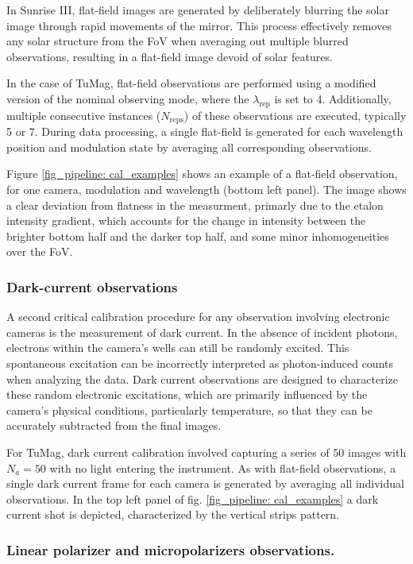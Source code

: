 In Sunrise III, flat-field images are generated by deliberately blurring the solar image through rapid movements of the mirror. This process effectively removes any solar structure from the FoV when averaging out multiple blurred observations, resulting in a flat-field image devoid of solar features.

In the case of TuMag, flat-field observations are performed using a modified version of the nominal observing mode, where the $\lambda_{\text{rep}}$ is set to 4. Additionally, multiple consecutive instances ($N_{\text{reps}}$) of these observations are executed, typically 5 or 7. During data processing, a single flat-field is generated for each wavelength position and modulation state by averaging all corresponding observations.

Figure \ref{fig_pipeline: cal_examples} shows an example of a flat-field observation, for one camera, modulation and wavelength (bottom left panel). The image shows a clear deviation from flatness in the measurment, primarly due to the etalon intensity gradient, which accounts for the change in intensity between the brighter bottom half and the darker top half, and some minor inhomogeneities over the FoV. 

\subsubsection{Dark-current observations}

A second critical calibration procedure for any observation involving electronic cameras is the measurement of dark current. In the absence of incident photons, electrons within the camera's wells can still be randomly excited. This spontaneous excitation can be incorrectly interpreted as photon-induced counts when analyzing the data. Dark current observations are designed to characterize these random electronic excitations, which are primarily influenced by the camera's physical conditions, particularly temperature, so that they can be accurately subtracted from the final images.

For TuMag, dark current calibration involved capturing a series of 50 images with $N_a = 50$ with no light entering the instrument. As with flat-field observations, a single dark current frame for each camera is generated by averaging all individual observations. In the top left panel of fig. \ref{fig_pipeline: cal_examples} a dark current shot is depicted, characterized by the vertical strips pattern.  

\subsubsection{Linear polarizer and micropolarizers observations.}

